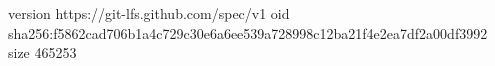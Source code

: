version https://git-lfs.github.com/spec/v1
oid sha256:f5862cad706b1a4c729c30e6a6ee539a728998c12ba21f4e2ea7df2a00df3992
size 465253
